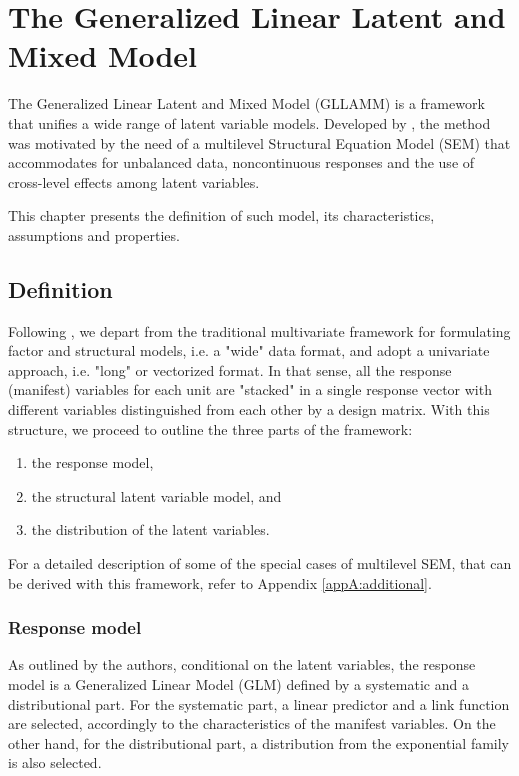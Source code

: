 \chapter{The Generalized Linear Latent and Mixed Model} \label{chap:framework}

The Generalized Linear Latent and Mixed Model (GLLAMM) is a framework that unifies a wide range of latent variable models. Developed by \citet{Rabe_et_al_2004a, Rabe_et_al_2004c, Skrondal_et_al_2004a}, the method was motivated by the need of a multilevel Structural Equation Model (SEM) that accommodates for unbalanced data, noncontinuous responses and the use of cross-level effects among latent variables. 

This chapter presents the definition of such model, its characteristics, assumptions and properties.


\section{Definition}
Following \citet{Rabe_et_al_2004a, Rabe_et_al_2012}, we depart from the traditional multivariate framework for formulating factor and structural models, i.e. a "wide" data format, and adopt a univariate approach, i.e. "long" or vectorized format. In that sense, all the response (manifest) variables for each unit are "stacked" in a single response vector with different variables distinguished from each other by a design matrix. With this structure, we proceed to outline the three parts of the framework: 
\begin{enumerate}
	\item the response model, 
	\item the structural latent variable model, and 
	\item the distribution of the latent variables. 
\end{enumerate}
For a detailed description of some of the special cases of multilevel SEM, that can be derived with this framework, refer to Appendix \ref{appA:additional}.


\subsection{Response model}
As outlined by the authors, conditional on the latent variables, the response model is a Generalized Linear Model (GLM) defined by a systematic and a distributional part. For the systematic part, a linear predictor and a link function are selected, accordingly to the characteristics of the manifest variables. On the other hand, for the distributional part, a distribution from the exponential family is also selected. 

